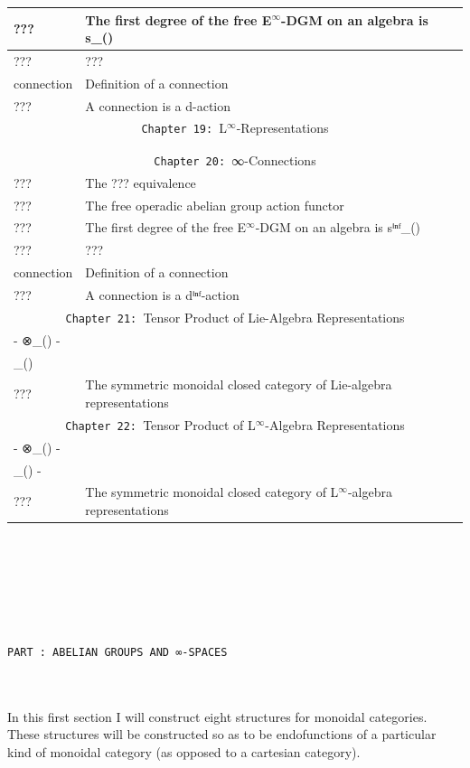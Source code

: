 \documentclass{book}
\theoremstyle{definition}
\newcounter{pcounter}
\newcounter{partcount}
\renewcommand{\part}[1]{
\newpage
{
\Huge 
\begin{center}
\ \\
\ \\
\ \\
\ \\
\ \\
\ \\
\thispagestyle{empty}
\texttt{PART {\thepartcount}: #1}
\stepcounter{partcount}
\end{center}}
\ \\
\ \\
}
\begin{document}
{\begin{longtable}{|| l || l ||}
\hline
??? & The first degree of the free E${}^{\infty}$-DGM on an algebra is s\_() \\
\hline
???   & ??? \\
\hline
connection & Definition of a connection \\
\hline
??? & A connection is a d-action \\
\hline \hline
\multicolumn{2}{||c||}{\texttt{Chapter 19: }L${}^{\infty}$-Representations} \\
\hline \hline
 & \\
\hline
 & \\
\hline \hline
\multicolumn{2}{||c||}{\texttt{Chapter 20: }∞-Connections} \\
\hline \hline
??? & The ??? equivalence \\
\hline
??? & The free operadic abelian group action functor \\
\hline
??? & The first degree of the free E${}^{\infty}$-DGM on an algebra is sⁱⁿᶠ\_() \\
\hline
???  & ??? \\
\hline
connection & Definition of a connection \\
\hline
??? & A connection is a dⁱⁿᶠ-action\\
\hline \hline
\multicolumn{2}{||c||}{\texttt{Chapter 21: }Tensor Product of Lie-Algebra Representations} \\
\hline \hline
- ⊗\_() - &  \\
\hline
[-,-]\_() &  \\
\hline
??? & The symmetric monoidal closed category of Lie-algebra representations \\
\hline \hline
\multicolumn{2}{||c||}{\texttt{Chapter 22: }Tensor Product of L${}^{\infty}$-Algebra Representations} \\
\hline \hline
- ⊗\_() -  &  \\
 \hline
[-,-]\_() - &  \\
 \hline
??? & The symmetric monoidal closed category of L${}^{\infty}$-algebra representations\\
 \hline \hline
\end{longtable}
}



\part{ABELIAN GROUPS AND ∞-SPACES}

In this first section I will construct eight structures for monoidal categories. These structures will be constructed so as to be endofunctions of a particular kind of monoidal category (as opposed to a cartesian category).\\
\end{document}
